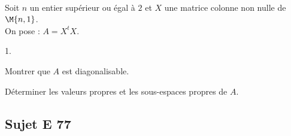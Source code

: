 \documentclass[11pt]{article}%
\begin{document}

\begin{exerciceSP}~\\
  Soit $n$ un entier supérieur ou égal à $2$ et $X$ une matrice
  colonne non nulle de $\M{n,1}$.\\
  On pose : $A=X ^t X$.
  \begin{noliste}{1.}
    \setlength{\itemsep}{2mm}
  \item Montrer que $A$ est diagonalisable.
  \item Déterminer les valeurs propres et les sous-espaces propres de
    $A$.
  \end{noliste}
\end{exerciceSP}



\subsection*{Sujet E 77}

\end{document}
